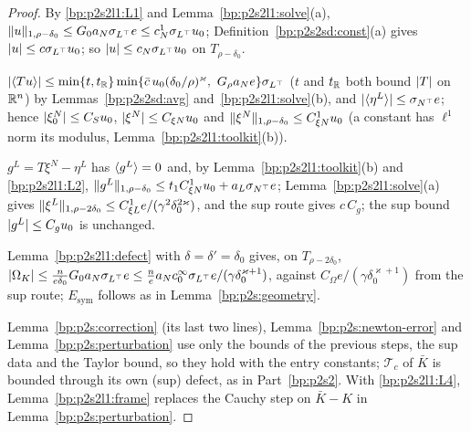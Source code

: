 \begin{proof}
\label{step:p2s2l1:ea-n}
By \ref{bp:p2s2l1:L1} and Lemma~\ref{bp:p2s2l1:solve}(a), $\lVert u\rVert_{1,\rho-\delta_0}\le G_0a_N\sigma_{L^\top}e\le c^1_N\sigma_{L^\top}u_0$; Definition~\ref{bp:p2s2sd:const}(a)
gives $\lvert u\rvert\le c\sigma_{L^\top}u_0$; so $\lvert u\rvert\le c_N\sigma_{L^\top}u_0$ on $T_{\rho-\delta_0}$.

\label{step:p2s2l1:ea-avg}
$\lvert \langle Tu\rangle\rvert\le\min\{t,t_{\mathbb{R}}\}\min\{\bar c\,u_0(\delta_0/\rho)^\varkappa,\ G_\rho a_N e\}\sigma_{L^\top}$ ($t$ and $t_{\mathbb{R}}$ both bound $\lvert T\rvert$ on $\mathbb{R}^n$) by Lemmas~\ref{bp:p2s2sd:avg} and~\ref{bp:p2s2l1:solve}(b), and
$\lvert \langle \eta^L\rangle\rvert\le\sigma_{N^\top}e$; hence $\lvert \xi^N_0\rvert\le C_Su_0$, $\lvert \xi^N\rvert\le C_{\xi N}u_0$ and $\lVert \xi^N\rVert_{1,\rho-\delta_0}\le C^1_{\xi N}u_0$
(a constant has $\ell^1$ norm its modulus, Lemma~\ref{bp:p2s2l1:toolkit}(b)).

\label{step:p2s2l1:ea-l}
$g^L=T\xi^N-\eta^L$ has $\langle g^L\rangle=0$ and, by Lemma~\ref{bp:p2s2l1:toolkit}(b) and \ref{bp:p2s2l1:L2},
$\lVert g^L\rVert_{1,\rho-\delta_0}\le t_1C^1_{\xi N}u_0+a_L\sigma_{N^\top}e$; Lemma~\ref{bp:p2s2l1:solve}(a) gives
$\lVert \xi^L\rVert_{1,\rho-2\delta_0}\le C^1_{\xi L}e/(\gamma^2\delta_0^{2\varkappa})$, and the sup route gives $c\,C_g$; the sup bound $\lvert g^L\rvert\le C_gu_0$ is unchanged.

\label{step:p2s2l1:ea-om}
Lemma~\ref{bp:p2s2l1:defect} with $\delta=\delta'=\delta_0$ gives, on $T_{\rho-2\delta_0}$,
$\lvert \Omega_K\rvert\le\frac n{e\delta_0}G_0a_N\sigma_{L^\top}e\le\frac ne a_Nc^\infty_0\sigma_{L^\top}e/(\gamma\delta_0^{\varkappa+1})$, against $C_\Omega e/(\gamma\delta_0^{\varkappa+1})$ from the sup route; $E_{\mathrm{sym}}$ follows as in Lemma~\ref{bp:p2s:geometry}.

\label{step:p2s2l1:ea-rest}
Lemma~\ref{bp:p2s:correction} (its last two lines), Lemma~\ref{bp:p2s:newton-error} and Lemma~\ref{bp:p2s:perturbation} use only the bounds of the previous
steps, the sup data and the Taylor bound, so they hold with the entry constants; $\mathcal T_c$ of $\bar K$ is bounded through its own (sup) defect,
as in Part~\ref{bp:p2s2}. With \ref{bp:p2s2l1:L4}, Lemma~\ref{bp:p2s2l1:frame} replaces the Cauchy step on $\bar K-K$ in Lemma~\ref{bp:p2s:perturbation}.
\end{proof}

